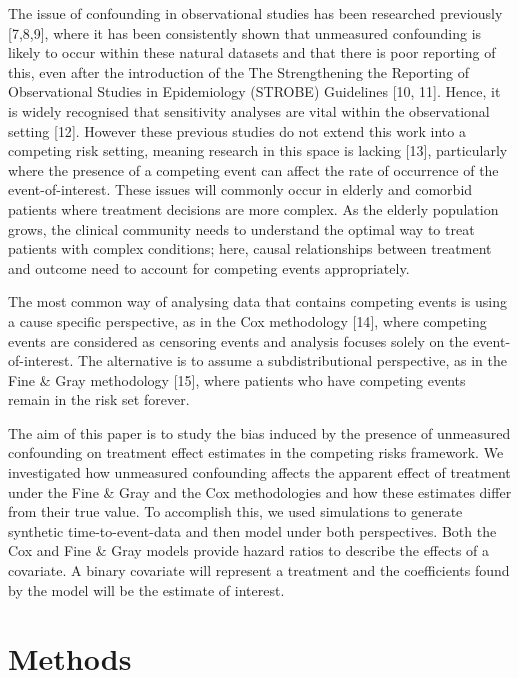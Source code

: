 \documentclass[
]{article}
\begin{document}
The issue of confounding in observational studies has been researched previously {[}7,8,9{]}, where it has been consistently shown that unmeasured confounding is likely to occur within these natural datasets and that there is poor reporting of this, even after the introduction of the The Strengthening the Reporting of Observational Studies in Epidemiology (STROBE) Guidelines {[}10, 11{]}. Hence, it is widely recognised that sensitivity analyses are vital within the observational setting {[}12{]}. However these previous studies do not extend this work into a competing risk setting, meaning research in this space is lacking {[}13{]}, particularly where the presence of a competing event can affect the rate of occurrence of the event-of-interest. These issues will commonly occur in elderly and comorbid patients where treatment decisions are more complex. As the elderly population grows, the clinical community needs to understand the optimal way to treat patients with complex conditions; here, causal relationships between treatment and outcome need to account for competing events appropriately.

The most common way of analysing data that contains competing events is using a cause specific perspective, as in the Cox methodology {[}14{]}, where competing events are considered as censoring events and analysis focuses solely on the event-of-interest. The alternative is to assume a subdistributional perspective, as in the Fine \& Gray methodology {[}15{]}, where patients who have competing events remain in the risk set forever.

The aim of this paper is to study the bias induced by the presence of unmeasured confounding on treatment effect estimates in the competing risks framework. We investigated how unmeasured confounding affects the apparent effect of treatment under the Fine \& Gray and the Cox methodologies and how these estimates differ from their true value. To accomplish this, we used simulations to generate synthetic time-to-event-data and then model under both perspectives. Both the Cox and Fine \& Gray models provide hazard ratios to describe the effects of a covariate. A binary covariate will represent a treatment and the coefficients found by the model will be the estimate of interest.

\hypertarget{methods-1}{%
\section{Methods}\label{methods-1}}
\end{document}
